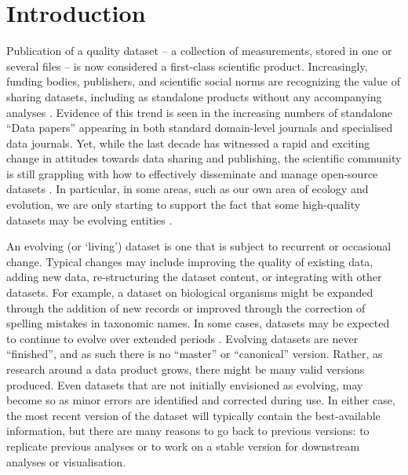 \documentclass[a4paper,num-refs]{assets/oup-contemporary}
\begin{document}
\section{Introduction}

Publication of a quality dataset -- a collection of measurements, stored in one or several files -- is now considered a first-class scientific product. Increasingly, funding bodies, publishers, and scientific social norms are recognizing the value of sharing datasets, including as standalone products without any accompanying analyses \cite{Whitlock-2011,Fairbairn-2011,Piwowar-2011,VanNoorden-2013,Gibney-2013}. Evidence of this trend is seen in the increasing numbers of standalone ``Data papers'' appearing in both standard domain-level journals and specialised data journals. Yet, while the last decade has witnessed a rapid and exciting change in attitudes towards data sharing and publishing, the scientific community is still grappling with how to effectively disseminate and manage open-source datasets \cite{Whitlock-2011, Goodman-2014, Force11-2014, Lowndes-2017, Perkel-2016, VanNoorden-2013, Kratz-2015,Wilkinson-2016, Yenni-2018}. In particular, in some areas, such as our own area of ecology and evolution, we are only starting to support the fact that some high-quality datasets may be evolving entities \cite{Yenni-2018}.

An evolving (or `living') dataset is one that is subject to recurrent or occasional change. Typical changes may include improving the quality of existing data, adding new data, re-structuring the dataset content, or integrating with other datasets. For example, a dataset on biological organisms might be expanded through the addition of new records or improved through the correction of spelling mistakes in taxonomic names. In some cases, datasets may be expected to continue to evolve over extended periods \cite[e.g.][]{Ernest-2018}. Evolving datasets are never ``finished'', and as such there is no ``master'' or ``canonical'' version. Rather, as research around a data product grows, there might be many valid versions produced. Even datasets that are not initially envisioned as evolving, may become so as minor errors are identified and corrected during use. In either case, the most recent version of the dataset will typically contain the best-available information, but there are many reasons to go back to previous versions: to replicate previous analyses or to work on a stable version for downstream analyses or visualisation.  
\end{document}
